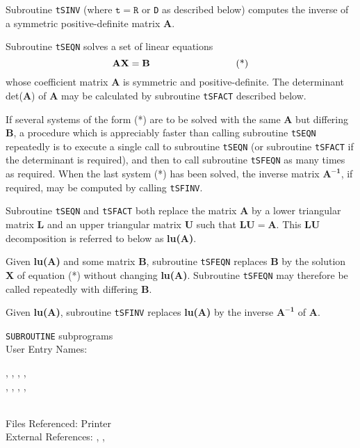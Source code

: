                     
                     
\Submitter{}                           
Subroutine {\tt tSINV} (where $\mathtt{t=R}$ or {\tt D} as described
below) computes the inverse of a symmetric positive-definite matrix
{\bf A}.
\par
Subroutine {\tt tSEQN} solves a set of linear equations
$$\mathbf{AX=B} \mbox{\hspace{3cm} (*)}$$
whose coefficient matrix {\bf A} is symmetric and positive-definite.
The determinant det({\bf A}) of {\bf A} may be calculated by subroutine
{\tt tSFACT} described below.
\par
If several systems of the form (*) are to be solved with the same
{\bf A} but differing {\bf B}, a procedure which
is appreciably faster than calling subroutine {\tt tSEQN} repeatedly
is to execute a single call to subroutine {\tt tSEQN} (or subroutine
{\tt tSFACT} if the determinant is required), and then to call subroutine
{\tt tSFEQN} as many times as required. When the last system (*) has
been solved, the inverse matrix $\mathbf{A^{-1}}$, if required, may
be computed by calling {\tt tSFINV}.
\par
Subroutine {\tt tSEQN} and {\tt tSFACT} both replace the matrix
{\bf A} by a lower triangular matrix {\bf L} and an upper triangular
matrix {\bf U} such that $\mathbf{LU=A}$. This {\bf LU} decomposition is
referred to below as {\bf lu(A)}.
\par
Given {\bf lu(A)} and some matrix {\bf B}, subroutine {\tt tSFEQN}
replaces {\bf B} by the solution {\bf X} of equation (*) without
changing {\bf lu(A)}. Subroutine {\tt tSFEQN} may therefore be called
repeatedly with differing {\bf B}.
\par
Given {\bf lu(A)}, subroutine {\tt tSFINV} replaces {\bf lu(A)} by the
inverse $\mathbf{A^{-1}}$ of {\bf A}.
\par
\Structure
{\tt SUBROUTINE} subprograms \\
User Entry Names: \parbox[t]{.6 \textwidth} {
, , , , \\
, , , , 
} \\
Files Referenced: Printer\\
External References: , ,

